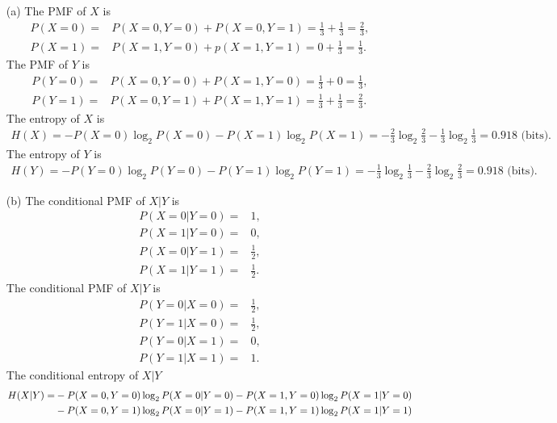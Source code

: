 \documentclass{assignment}
\begin{document}
\begin{sol}
    \begin{itemize}
        \item[(a)] The PMF of $X$ is
        \begin{align}
            P(X=0)=&P(X=0,Y=0)+P(X=0,Y=1)=\frac{1}{3}+\frac{1}{3}=\frac{2}{3},\\
            P(X=1)=&P(X=1,Y=0)+p(X=1,Y=1)=0+\frac{1}{3}=\frac{1}{3}.
        \end{align}
        The PMF of $Y$ is
        \begin{align}
            P(Y=0)=&P(X=0,Y=0)+P(X=1,Y=0)=\frac{1}{3}+0=\frac{1}{3},\\
            P(Y=1)=&P(X=0,Y=1)+P(X=1,Y=1)=\frac{1}{3}+\frac{1}{3}=\frac{2}{3}.
        \end{align}
        The entropy of $X$ is
        \begin{align}
            H(X)=-P(X=0)\log_2P(X=0)-P(X=1)\log_2P(X=1)=-\frac{2}{3}\log_2\frac{2}{3}-\frac{1}{3}\log_2\frac{1}{3}=0.918\text{ (bits)}.
        \end{align}
        The entropy of $Y$ is
        \begin{align}
            H(Y)=-P(Y=0)\log_2P(Y=0)-P(Y=1)\log_2P(Y=1)=-\frac{1}{3}\log_2\frac{1}{3}-\frac{2}{3}\log_2\frac{2}{3}=0.918\text{ (bits)}.
        \end{align}
        \item[(b)] The conditional PMF of $X\vert Y$ is
        \begin{align}
            P(X=0\vert Y=0)=&1,\\
            P(X=1\vert Y=0)=&0,\\
            P(X=0\vert Y=1)=&\frac{1}{2},\\
            P(X=1\vert Y=1)=&\frac{1}{2}.
        \end{align}
        The conditional PMF of $X\vert Y$ is
        \begin{align}
            P(Y=0\vert X=0)=&\frac{1}{2},\\
            P(Y=1\vert X=0)=&\frac{1}{2},\\
            P(Y=0\vert X=1)=&0,\\
            P(Y=1\vert X=1)=&1.
        \end{align}
        The conditional entropy of $X\vert Y$
        \begin{align}
            \notag H(X\vert Y)=&-P(X=0,Y=0)\log_2P(X=0\vert Y=0)-P(X=1,Y=0)\log_2P(X=1\vert Y=0)\\
            \notag&-P(X=0,Y=1)\log_2P(X=0\vert Y=1)-P(X=1,Y=1)\log_2P(X=1\vert Y=1)\\

\end{align}
\end{itemize}
\end{sol}
\end{document}

